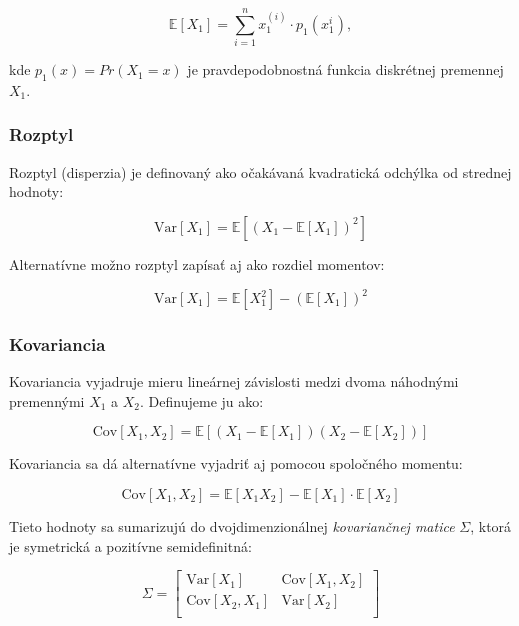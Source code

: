 \begin{equation}
\mathbb{E}[X_1] = \sum_{i=1}^{n} x_1^{(i)} \cdot p_1(x_1^{i}),
\end{equation}

kde $p_1(x) = Pr(X_1=x)$ je pravdepodobnostná funkcia diskrétnej premennej \(X_1\).

\subsubsection{Rozptyl}\label{subsubsec:joint_variance}

Rozptyl (disperzia) je definovaný ako očakávaná kvadratická odchýlka od strednej hodnoty:

\begin{equation}
\mathrm{Var}[X_1] = \mathbb{E}[(X_1 - \mathbb{E}[X_1])^2]
\end{equation}

Alternatívne možno rozptyl zapísať aj ako rozdiel momentov:

\begin{equation}
\mathrm{Var}[X_1] = \mathbb{E}[X_1^2] - (\mathbb{E}[X_1])^2
\end{equation}

\subsubsection{Kovariancia}\label{subsubsec:joint_covariance}

Kovariancia vyjadruje mieru lineárnej závislosti medzi dvoma náhodnými premennými \(X_1\) a \(X_2\). Definujeme ju ako:

\begin{equation}
\mathrm{Cov}[X_1, X_2] = \mathbb{E}[(X_1 - \mathbb{E}[X_1])(X_2 - \mathbb{E}[X_2])]
\end{equation}

Kovariancia sa dá alternatívne vyjadriť aj pomocou spoločného momentu:

\begin{equation}
\mathrm{Cov}[X_1, X_2] = \mathbb{E}[X_1 X_2] - \mathbb{E}[X_1] \cdot \mathbb{E}[X_2]
\end{equation}

Tieto hodnoty sa sumarizujú do dvojdimenzionálnej \textit{kovariančnej matice} \(\Sigma\), ktorá je symetrická a pozitívne semidefinitná:

\begin{equation}
\Sigma = 
\begin{bmatrix}
\mathrm{Var}[X_1] & \mathrm{Cov}[X_1, X_2] \\
\mathrm{Cov}[X_2, X_1] & \mathrm{Var}[X_2] \\
\end{bmatrix}
\end{equation}

